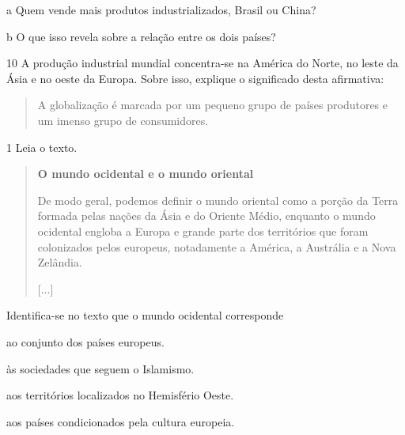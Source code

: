 \num{a} Quem vende mais produtos industrializados, Brasil ou China?



\num{b} O que isso revela sobre a relação entre os dois países?



\num{10} A produção industrial mundial concentra-se na América do Norte, no leste
da Ásia e no oeste da Europa. Sobre isso, explique o significado desta afirmativa:

\begin{quote}
A globalização é marcada por um pequeno grupo de países produtores e um
imenso grupo de consumidores.
\end{quote}




\num{1} Leia o texto.

\begin{quote}
\textbf{O mundo ocidental e o mundo oriental}

De modo geral, podemos definir o mundo oriental como a porção
da Terra formada pelas nações da Ásia e do Oriente Médio, enquanto o
mundo ocidental engloba a Europa e grande parte dos territórios que
foram colonizados pelos europeus, notadamente a América, a Austrália e a
Nova Zelândia.

{[}...{]}

\end{quote}

Identifica-se no texto que o mundo ocidental corresponde

\begin{escolha}
\item
  ao conjunto dos países europeus.
\item
  às sociedades que seguem o Islamismo.
\item
  aos territórios localizados no Hemisfério Oeste.
\item
  aos países condicionados pela cultura europeia.
\end{escolha}

